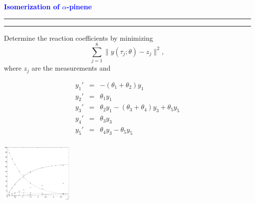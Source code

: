 \documentclass{seminar}
\newcommand{\redstripe}{\textcolor{red}{\hrule height 2.0pt\hfil}
             \vspace{-1.8pt}
             \textcolor{red}{\hrule height 1.0pt\hfil}
}
\newcommand{\heading}[1]{%
   \centerline{\textcolor{blue}{\textbf{#1}}}%
    \redstripe%
    \bigskip
}
\begin{document}
\begin{slide}

\heading{Isomerization of $ \alpha $-pinene}

Determine the reaction coefficients
by minimizing
\[
\sum _ {j=1}^8 \| y ( \tau_j ; \theta ) - z_j \| ^ 2 ,
\]
where $z_j$ are the measurements and

\begin{minipage}[b]{.45\linewidth}
\begin{eqnarray*}
y_1'  & = & -(\theta_1 + \theta_2) y_1 \\
y_2'  & = & \theta_1 y_1 \\
y_3'  & = & \theta_2 y_1 - (\theta_3 + \theta_4 )y_3 + \theta_5 y_5 \\
y_4'  & = & \theta_3 y_3 \\
y_5'  & = & \theta_4 y_3 - \theta_5 y_5  \\
\end{eqnarray*}
\end{minipage} 
\hfil 
\begin{minipage}[b]{.45\linewidth}
\centerline{\includegraphics[width=1.4in]{../images/pinene}}
\end{minipage}


\vfill

\end{slide}
\end{document}
